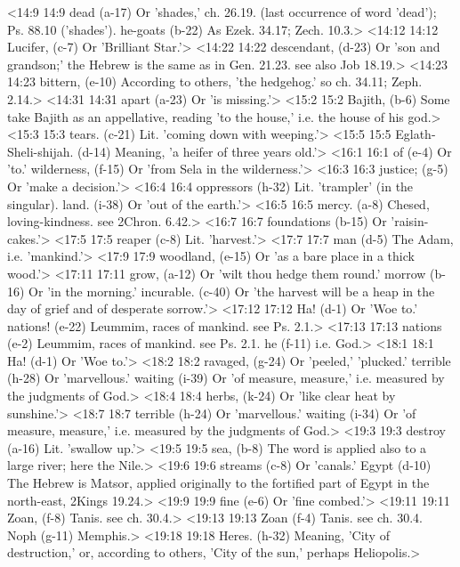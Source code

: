 <14:9 14:9  dead (a-17)  Or 'shades,' ch. 26.19. (last occurrence of word 'dead'); Ps.  88.10 ('shades').
  he-goats (b-22)  As Ezek. 34.17; Zech. 10.3.>
<14:12 14:12  Lucifer, (c-7)  Or 'Brilliant Star.'>
<14:22 14:22  descendant, (d-23)  Or 'son and grandson;' the Hebrew is the same as in Gen. 21.23. see also Job 18.19.>
<14:23 14:23  bittern, (e-10)  According to others, 'the hedgehog.' so ch. 34.11; Zeph. 2.14.>
<14:31 14:31  apart (a-23)  Or 'is missing.'>
<15:2 15:2  Bajith, (b-6)  Some take Bajith as an appellative, reading 'to the house,'  i.e. the house of his god.>
<15:3 15:3  tears. (c-21)  Lit. 'coming down with weeping.'>
<15:5 15:5  Eglath-Sheli-shijah. (d-14)  Meaning, 'a heifer of three years old.'>
<16:1 16:1  of (e-4)  Or 'to.'
  wilderness, (f-15)  Or 'from Sela in the wilderness.'>
<16:3 16:3  justice; (g-5)  Or 'make a decision.'>
<16:4 16:4  oppressors (h-32)  Lit. 'trampler' (in the singular).
  land. (i-38)  Or 'out of the earth.'>
<16:5 16:5  mercy. (a-8)  Chesed, loving-kindness. see 2Chron. 6.42.>
<16:7 16:7  foundations (b-15)  Or 'raisin-cakes.'>
<17:5 17:5  reaper (c-8)  Lit. 'harvest.'>
<17:7 17:7  man (d-5)  The Adam, i.e. 'mankind.'>
<17:9 17:9  woodland, (e-15)  Or 'as a bare place in a thick wood.'>
<17:11 17:11  grow, (a-12)  Or 'wilt thou hedge them round.'
  morrow (b-16)  Or 'in the morning.'
  incurable. (c-40)  Or 'the harvest will be a heap in the day of grief and of  desperate sorrow.'>
<17:12 17:12  Ha! (d-1)  Or 'Woe to.'
 nations! (e-22)  Leummim, races of mankind. see Ps. 2.1.>
<17:13 17:13  nations (e-2)  Leummim, races of mankind. see Ps. 2.1.
  he (f-11)  i.e. God.>
<18:1 18:1  Ha! (d-1)  Or 'Woe to.'>
<18:2 18:2  ravaged, (g-24)  Or 'peeled,' 'plucked.'
  terrible (h-28)  Or 'marvellous.'
  waiting (i-39) Or 'of measure, measure,' i.e. measured by the judgments of God.>
<18:4 18:4  herbs, (k-24)  Or 'like clear heat by sunshine.'>
<18:7 18:7  terrible (h-24)  Or 'marvellous.'
  waiting (i-34)  Or 'of measure, measure,' i.e. measured by the judgments of God.>
<19:3 19:3  destroy (a-16)  Lit. 'swallow up.'>
<19:5 19:5  sea, (b-8)  The word is applied also to a large river; here the Nile.>
<19:6 19:6  streams (c-8)  Or 'canals.'
  Egypt (d-10)  The Hebrew is Matsor, applied originally to the fortified  part of Egypt in the north-east, 2Kings 19.24.>
<19:9 19:9  fine (e-6)  Or 'fine combed.'>
<19:11 19:11  Zoan, (f-8)  Tanis. see ch. 30.4.>
<19:13 19:13  Zoan (f-4)  Tanis. see ch. 30.4.
  Noph (g-11)  Memphis.>
<19:18 19:18  Heres. (h-32)  Meaning, 'City of destruction,' or, according to others, 'City  of the sun,' perhaps Heliopolis.>
